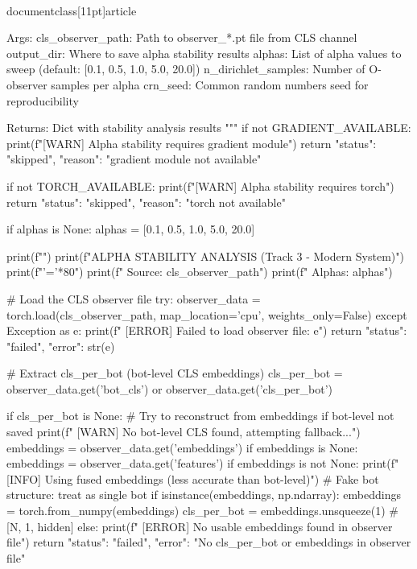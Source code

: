 \\documentclass[11pt]{article}
\begin{document}
\begin{CodeBlock}
    Args:
        cls_observer_path: Path to observer_*.pt file from CLS channel
        output_dir: Where to save alpha stability results
        alphas: List of alpha values to sweep (default: [0.1, 0.5, 1.0, 5.0, 20.0])
        n_dirichlet_samples: Number of O-observer samples per alpha
        crn_seed: Common random numbers seed for reproducibility

    Returns:
        Dict with stability analysis results
    """
    if not GRADIENT_AVAILABLE:
        print(f"[WARN] Alpha stability requires gradient module")
        return {"status": "skipped", "reason": "gradient module not available"}

    if not TORCH_AVAILABLE:
        print(f"[WARN] Alpha stability requires torch")
        return {"status": "skipped", "reason": "torch not available"}

    if alphas is None:
        alphas = [0.1, 0.5, 1.0, 5.0, 20.0]

    print(f"")
    print(f"ALPHA STABILITY ANALYSIS (Track 3 - Modern System)")
    print(f"{'='*80}")
    print(f"  Source: {cls_observer_path}")
    print(f"  Alphas: {alphas}")

    # Load the CLS observer file
    try:
        observer_data = torch.load(cls_observer_path, map_location='cpu', weights_only=False)
    except Exception as e:
        print(f"  [ERROR] Failed to load observer file: {e}")
        return {"status": "failed", "error": str(e)}

    # Extract cls_per_bot (bot-level CLS embeddings)
    cls_per_bot = observer_data.get('bot_cls') or observer_data.get('cls_per_bot')

    if cls_per_bot is None:
        # Try to reconstruct from embeddings if bot-level not saved
        print(f"  [WARN] No bot-level CLS found, attempting fallback...")
        embeddings = observer_data.get('embeddings')
        if embeddings is None:
            embeddings = observer_data.get('features')
        if embeddings is not None:
            print(f"  [INFO] Using fused embeddings (less accurate than bot-level)")
            # Fake bot structure: treat as single bot
            if isinstance(embeddings, np.ndarray):
                embeddings = torch.from_numpy(embeddings)
            cls_per_bot = embeddings.unsqueeze(1)  # [N, 1, hidden]
        else:
            print(f"  [ERROR] No usable embeddings found in observer file")
            return {"status": "failed", "error": "No cls_per_bot or embeddings in observer file"}


\end{CodeBlock}
\end{document}
